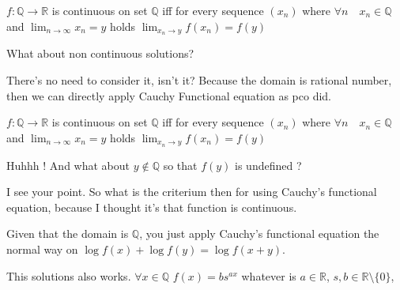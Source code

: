 \begin{solution}
	$f:\mathbb Q\to \mathbb R$ is continuous on set $\mathbb Q $ iff for every sequence $(x_n)$ where $\forall n \quad x_n\in \mathbb Q$ and $\lim_{n\to \infty}x_n=y$ holds $\lim_{x_n\to y} f(x_n)=f(y)$
\end{solution}



\begin{solution}
	\begin{tcolorbox}What about non continuous solutions?\end{tcolorbox}

There's no need to consider it, isn't it? Because the domain is rational number, then we can directly apply Cauchy Functional equation as pco did.
\end{solution}



\begin{solution}
	\begin{tcolorbox}$f:\mathbb Q\to \mathbb R$ is continuous on set $\mathbb Q $ iff for every sequence $(x_n)$ where $\forall n \quad x_n\in \mathbb Q$ and $\lim_{n\to \infty}x_n=y$ holds $\lim_{x_n\to y} f(x_n)=f(y)$\end{tcolorbox}
Huhhh !
And what about $y\notin\mathbb Q$ so that $f(y)$ is undefined ?

\end{solution}



\begin{solution}
	I see your point. So what is the criterium then for using Cauchy's functional equation, because I thought it's that function is continuous.
\end{solution}



\begin{solution}
	Given that the domain is $\mathbb{Q}$, you just apply Cauchy's functional equation the normal way on $\log{f(x)}+\log{f(y)}=\log{f(x+y)}$.
\end{solution}



\begin{solution}
	This solutions also works. $\forall x\in\mathbb Q$ $f(x)=bs^{ax}$ whatever is $a\in\mathbb R$, $s,b\in\mathbb R\setminus\{0\}$,
\end{solution}



